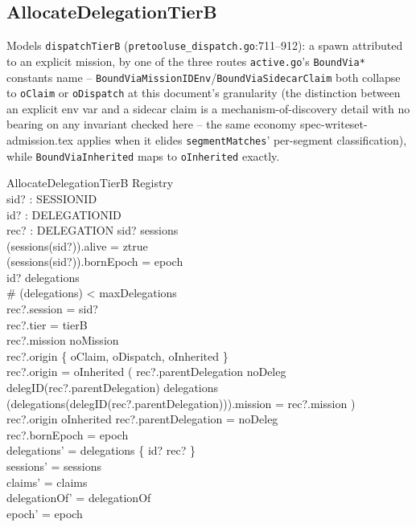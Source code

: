 \documentclass[a4paper,10pt,fleqn]{article}
\newcommand{\fpath}[1]{\texttt{#1}}
\newcommand{\field}[1]{\texttt{#1}}
\begin{document}
\subsection{AllocateDelegationTierB}
\label{sec:opallocateb}

Models \field{dispatchTierB} (\fpath{pretooluse\_dispatch.go}:711--912):
a spawn attributed to an explicit mission, by one of the three routes
\fpath{active.go}'s \field{BoundVia*} constants name --
\field{BoundViaMissionIDEnv}/\field{BoundViaSidecarClaim} both collapse
to \field{oClaim} or \field{oDispatch} at this document's granularity
(the distinction between an explicit env var and a sidecar claim is a
mechanism-of-discovery detail with no bearing on any invariant checked
here -- the same economy spec-writeset-admission.tex applies when it
elides \field{segmentMatches}' per-segment classification), while
\field{BoundViaInherited} maps to \field{oInherited} exactly.

\begin{schema}{AllocateDelegationTierB}
\Delta Registry \\
sid? : SESSIONID \\
id? : DELEGATIONID \\
rec? : DELEGATION
\where
sid? \in \dom sessions \\
(sessions(sid?)).alive = ztrue \\
(sessions(sid?)).bornEpoch = epoch \\
id? \notin \dom delegations \\
\# (\dom delegations) < maxDelegations \\
rec?.session = sid? \\
rec?.tier = tierB \\
rec?.mission \neq noMission \\
rec?.origin \in \{ oClaim, oDispatch, oInherited \} \\
rec?.origin = oInherited \implies
  ( rec?.parentDelegation \neq noDeleg \land
    delegID(rec?.parentDelegation) \in \dom delegations \land
    (delegations(delegID(rec?.parentDelegation))).mission = rec?.mission ) \\
rec?.origin \neq oInherited \implies rec?.parentDelegation = noDeleg \\
rec?.bornEpoch = epoch \\
delegations' = delegations \oplus \{ id? \mapsto rec? \} \\
sessions' = sessions \\
claims' = claims \\
delegationOf' = delegationOf \\
epoch' = epoch
\end{schema}
\end{document}
